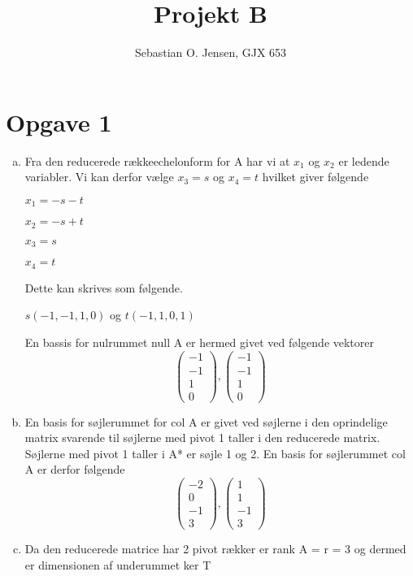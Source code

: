 \documentclass[12pt]{article}
\title{Projekt B}
\author{Sebastian O. Jensen, GJX 653}
\begin{document}
\maketitle
\newpage
\section{Opgave 1}
\begin{enumerate}[(a)]
\item

Fra den reducerede rækkeechelonform for A har vi at $x_1$ og $x_2$ er
ledende variabler. Vi kan derfor vælge  $x_3 = s$ og $x_4 = t$ hvilket giver
følgende

$x_1 = -s-t$

$x_2 = -s+t$

$x_3 = s$

$x_4 = t$

Dette kan skrives som følgende.

$s(-1,-1,1,0)$ og $t(-1,1,0,1)$

En bassis for nulrummet null A er hermed givet ved følgende vektorer
$$
\left(\begin{array}{c}
-1\\-1\\1\\0
\end{array}\right),
\left(\begin{array}{c}
-1\\-1\\1\\0
\end{array}\right)
$$

\item
En basis for søjlerummet for col A er givet ved søjlerne i den oprindelige
matrix svarende til søjlerne med pivot 1 taller i den reducerede matrix.
Søjlerne med pivot 1 taller i A* er søjle 1 og 2. En basis for søjlerummet col A
er derfor følgende
$$
\left(\begin{array}{c}
-2\\0\\-1\\3
\end{array}\right),
\left(\begin{array}{c}
1\\1\\-1\\3
\end{array}\right)
$$

\item
Da den reducerede matrice har 2 pivot rækker er rank A = r = 3 og dermed er
dimensionen af underummet ker T


\end{enumerate}
\end{document}
